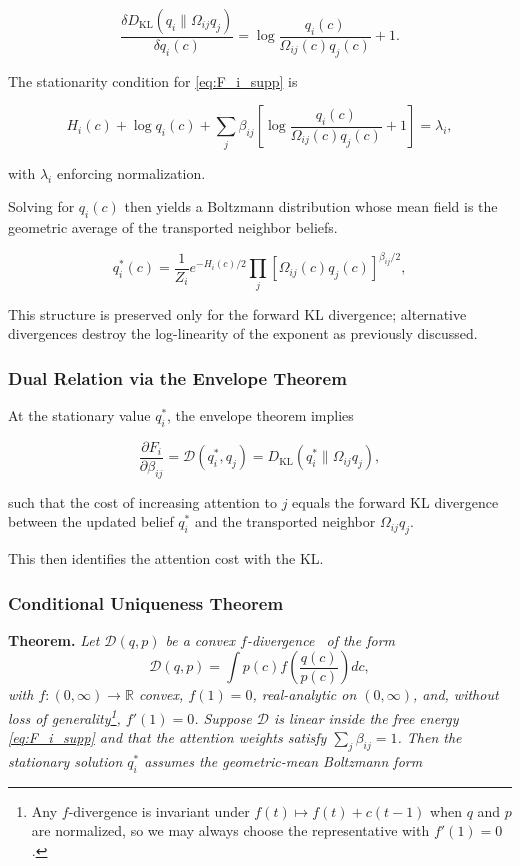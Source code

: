 \documentclass[twoside,11pt]{article}
\begin{document}
\[
\frac{\delta D_{\mathrm{KL}}(q_i \| \Omega_{ij} q_j)}{\delta q_i(c)}
= \log\frac{q_i(c)}{\Omega_{ij}(c) q_j(c)} + 1.
\]

The stationarity condition for \eqref{eq:F_i_supp} is

\begin{equation}
H_i(c)
+ \log q_i(c)
+ \sum_j \beta_{ij}
 \left[
\log\frac{q_i(c)}{\Omega_{ij}(c)q_j(c)}+1
\right]
= \lambda_i,
\end{equation}

with $\lambda_i$ enforcing normalization.

Solving for $q_i(c)$ then yields a Boltzmann distribution whose mean field is the geometric average of the transported neighbor beliefs.

\begin{equation}
q_i^*(c)
= \frac{1}{Z_i}
e^{-H_i(c)/2}
\prod_j
[\Omega_{ij}(c) q_j(c)]^{\beta_{ij}/2},
\label{eq:q_i_star_supp}
\end{equation}

This structure is preserved only for the forward KL divergence; alternative divergences destroy the log-linearity of the exponent as previously discussed.

\subsubsection{Dual Relation via the Envelope Theorem}
At the stationary value $q_i^*$, the envelope theorem implies

\begin{equation}
\frac{\partial F_i}{\partial \beta_{ij}}
= \mathcal{D}(q_i^*, q_j)
= D_{\mathrm{KL}}(q_i^* \| \Omega_{ij} q_j),
\label{eq:envelope_supp}
\end{equation}

such that the cost of increasing attention to $j$ equals the forward KL divergence between the updated belief $q_i^*$ and the transported neighbor $\Omega_{ij} q_j$.

This then identifies the attention cost with the KL.

\subsubsection{Conditional Uniqueness Theorem}
\label{thm:uniqueness_supp}

\textbf{Theorem.} \textit{Let\/ $\mathcal{D}(q,p)$ be a convex $f$-divergence~\citep{Csiszar1967} of the form
\[
\mathcal{D}(q,p)
= \int p(c) f \left(\frac{q(c)}{p(c)}\right)dc,
\]
with $f:(0,\infty)\to\mathbb{R}$ convex, $f(1)=0$, real-analytic on $(0,\infty)$, and, without loss of generality\footnote{Any $f$-divergence is invariant under $f(t)\mapsto f(t)+c(t-1)$ when $q$ and $p$ are normalized, so we may always choose the representative with $f'(1)=0$.}, $f'(1)=0$. Suppose $\mathcal{D}$ is linear inside the free energy \eqref{eq:F_i_supp} and that the attention weights satisfy $\sum_j\beta_{ij}=1$. Then the stationary solution $q_i^*$ assumes the geometric-mean Boltzmann form}
\end{document}

